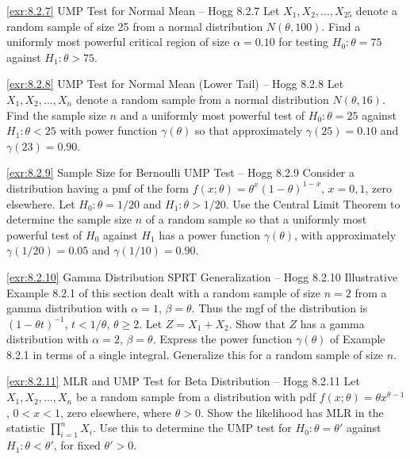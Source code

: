 \begin{exercise}{\ref{exr:8.2.7} UMP Test for Normal Mean -- Hogg 8.2.7}\label{exr:8.2.7}
Let $X_1, X_2, \ldots, X_{25}$ denote a random sample of size 25 from a normal distribution $N(\theta, 100)$. Find a uniformly most powerful critical region of size $\alpha = 0.10$ for testing $H_0: \theta = 75$ against $H_1: \theta > 75$.
\end{exercise}

\begin{exercise}{\ref{exr:8.2.8} UMP Test for Normal Mean (Lower Tail) -- Hogg 8.2.8}\label{exr:8.2.8}
Let $X_1, X_2, \ldots, X_n$ denote a random sample from a normal distribution $N(\theta, 16)$. Find the sample size $n$ and a uniformly most powerful test of $H_0: \theta = 25$ against $H_1: \theta < 25$ with power function $\gamma(\theta)$ so that approximately $\gamma(25) = 0.10$ and $\gamma(23) = 0.90$.
\end{exercise}

\begin{exercise}{\ref{exr:8.2.9} Sample Size for Bernoulli UMP Test -- Hogg 8.2.9}\label{exr:8.2.9}
Consider a distribution having a pmf of the form $f(x; \theta) = \theta^x(1-\theta)^{1-x}$, $x = 0, 1$, zero elsewhere. Let $H_0: \theta = 1/20$ and $H_1: \theta > 1/20$. Use the Central Limit Theorem to determine the sample size $n$ of a random sample so that a uniformly most powerful test of $H_0$ against $H_1$ has a power function $\gamma(\theta)$, with approximately $\gamma(1/20) = 0.05$ and $\gamma(1/10) = 0.90$.
\end{exercise}

\begin{exercise}{\ref{exr:8.2.10} Gamma Distribution SPRT Generalization -- Hogg 8.2.10}\label{exr:8.2.10}
Illustrative Example 8.2.1 of this section dealt with a random sample of size $n = 2$ from a gamma distribution with $\alpha = 1$, $\beta = \theta$. Thus the mgf of the distribution is $(1 - \theta t)^{-1}$, $t < 1/\theta$, $\theta \geq 2$. Let $Z = X_1 + X_2$. Show that $Z$ has a gamma distribution with $\alpha = 2$, $\beta = \theta$. Express the power function $\gamma(\theta)$ of Example 8.2.1 in terms of a single integral. Generalize this for a random sample of size $n$.
\end{exercise}

\begin{exercise}{\ref{exr:8.2.11} MLR and UMP Test for Beta Distribution -- Hogg 8.2.11}\label{exr:8.2.11}
Let $X_1, X_2, \ldots, X_n$ be a random sample from a distribution with pdf $f(x; \theta) = \theta x^{\theta-1}$, $0 < x < 1$, zero elsewhere, where $\theta > 0$. Show the likelihood has MLR in the statistic $\prod_{i=1}^n X_i$. Use this to determine the UMP test for $H_0: \theta = \theta'$ against $H_1: \theta < \theta'$, for fixed $\theta' > 0$.
\end{exercise}

